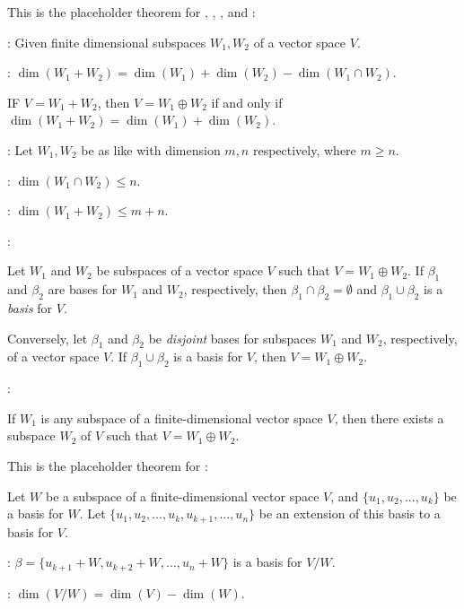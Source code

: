\begin{additional theorem} \label{athm 1.27}
This is the placeholder theorem for , , , and :

: Given finite dimensional subspaces \(W_1, W_2\) of a vector space \(V\).

: \(\dim(W_1 + W_2) = \dim(W_1) + \dim(W_2) - \dim(W_1 \cap W_2)\).

 IF \(V = W_1 + W_2\), then \(V = W_1 \oplus W_2\) if and only if \(\dim(W_1 + W_2) = \dim(W_1) + \dim(W_2)\).

: Let \(W_1, W_2\) be as like  with dimension \(m, n\) respectively, where \(m \ge n\).

: \(\dim(W_1 \cap W_2) \le n\).

: \(\dim(W_1 + W_2) \le m + n\).

:

 Let \(W_1\) and \(W_2\) be subspaces of a vector space \(V\) such that \(V = W_1 \oplus W_2\).
If \(\beta_1\) and \(\beta_2\) are bases for \(W_1\) and \(W_2\), respectively, then \(\beta_1 \cap \beta_2 = \emptyset\) and \(\beta_1 \cup \beta_2\) is a \emph{basis} for \(V\).

 Conversely, let \(\beta_1\) and \(\beta_2\) be \emph{disjoint} bases for subspaces \(W_1\) and \(W_2\), respectively, of a vector space \(V\).
If \(\beta_1 \cup \beta_2\) is a basis for \(V\), then \(V = W_1 \oplus W_2\).
    
:

 If \(W_1\) is any subspace of a finite-dimensional vector space \(V\), then there exists a subspace \(W_2\) of \(V\) such that \(V = W_1 \oplus W_2\).
\end{additional theorem}

\begin{additional theorem} \label{athm 1.28}
This is the placeholder theorem for :

Let \(W\) be a subspace of a finite-dimensional vector space \(V\), and \(\{ u_1, u_2, ..., u_k \}\) be a basis for \(W\).
Let \(\{ u_1, u_2, ..., u_k, u_{k + 1}, ..., u_n \}\) be an extension of this basis to a basis for \(V\).

: \(\beta = \{ u_{k + 1} + W, u_{k + 2} + W, ..., u_n + W \}\) is a basis for \(V / W\).

: \(\dim(V/W) = \dim(V) - \dim(W)\).
\end{additional theorem}